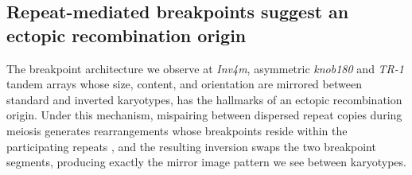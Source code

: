 \documentclass[9pt,twocolumn,twoside]{rilabRxiv}
\newcommand{\invfour}{\textit{Inv4m}\xspace}
\begin{document}

\subsection*{Repeat-mediated breakpoints suggest an ectopic recombination origin}
 
The breakpoint architecture we observe at \invfour, asymmetric \textit{knob180} and \textit{TR-1} tandem arrays whose size, content, and orientation are mirrored between standard and inverted karyotypes, has the hallmarks of an ectopic recombination origin.
Under this mechanism, mispairing between dispersed repeat copies during meiosis generates rearrangements whose breakpoints reside within the participating repeats \citep{zhang2004, delprat2009}, and the resulting inversion swaps the two breakpoint segments, producing exactly the mirror image pattern we see between karyotypes.
 
\end{document}
